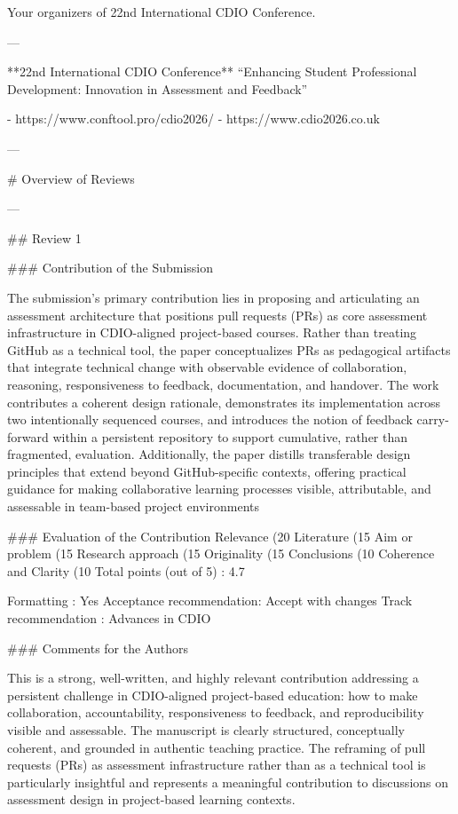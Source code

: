 Your organizers of 22nd International CDIO Conference.

---

**22nd International CDIO Conference**  
“Enhancing Student Professional Development: Innovation in Assessment and Feedback”

- https://www.conftool.pro/cdio2026/  
- https://www.cdio2026.co.uk  

---

# Overview of Reviews

---

## Review 1

### Contribution of the Submission

The submission’s primary contribution lies in proposing and articulating an assessment architecture that positions pull requests (PRs) as core assessment infrastructure in CDIO-aligned project-based courses. Rather than treating GitHub as a technical tool, the paper conceptualizes PRs as pedagogical artifacts that integrate technical change with observable evidence of collaboration, reasoning, responsiveness to feedback, documentation, and handover. The work contributes a coherent design rationale, demonstrates its implementation across two intentionally sequenced courses, and introduces the notion of feedback carry-forward within a persistent repository to support cumulative, rather than fragmented, evaluation. Additionally, the paper distills transferable design principles that extend beyond GitHub-specific contexts, offering practical guidance for making collaborative learning processes visible, attributable, and assessable in team-based project environments

### Evaluation of the Contribution
Relevance (20%
Literature (15%
Aim or problem (15%
Research approach (15%
Originality (15%
Conclusions (10%
Coherence and Clarity (10%
Total points (out of 5) : 4.7

Formatting               : Yes  
Acceptance recommendation: Accept with changes  
Track recommendation     : Advances in CDIO  

### Comments for the Authors

This is a strong, well-written, and highly relevant contribution addressing a persistent challenge in CDIO-aligned project-based education: how to make collaboration, accountability, responsiveness to feedback, and reproducibility visible and assessable. The manuscript is clearly structured, conceptually coherent, and grounded in authentic teaching practice. The reframing of pull requests (PRs) as assessment infrastructure rather than as a technical tool is particularly insightful and represents a meaningful contribution to discussions on assessment design in project-based learning contexts.

